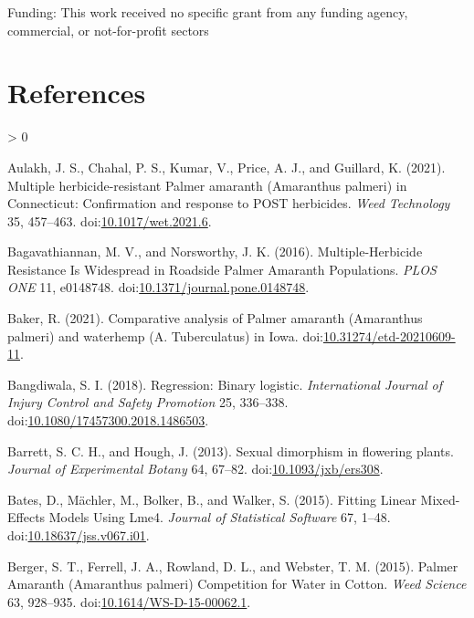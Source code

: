 \documentclass[utf8]{frontiersSCNS}
\newlength{\cslhangindent}
\newenvironment{CSLReferences}[2] %
 {%
  \setlength{\parindent}{0pt}
  \ifodd #1 \everypar{\setlength{\hangindent}{\cslhangindent}}\ignorespaces\fi
  \ifnum #2 > 0
  \setlength{\parskip}{#2\baselineskip}
  \fi
 }%
 {}
\begin{document}
Funding: This work received no specific grant from any funding agency,
commercial, or not-for-profit sectors

\hypertarget{references}{%
\section*{References}\label{references}}

\hypertarget{refs}{}
\begin{CSLReferences}{1}{0}
\leavevmode\hypertarget{ref-aulakh2021}{}%
Aulakh, J. S., Chahal, P. S., Kumar, V., Price, A. J., and Guillard, K.
(2021). Multiple herbicide-resistant {Palmer} amaranth ({Amaranthus}
palmeri) in {Connecticut}: Confirmation and response to {POST}
herbicides. \emph{Weed Technology} 35, 457--463.
doi:\href{https://doi.org/10.1017/wet.2021.6}{10.1017/wet.2021.6}.

\leavevmode\hypertarget{ref-bagavathiannan2016}{}%
Bagavathiannan, M. V., and Norsworthy, J. K. (2016). Multiple-{Herbicide
Resistance Is Widespread} in {Roadside Palmer Amaranth Populations}.
\emph{PLOS ONE} 11, e0148748.
doi:\href{https://doi.org/10.1371/journal.pone.0148748}{10.1371/journal.pone.0148748}.

\leavevmode\hypertarget{ref-baker2021}{}%
Baker, R. (2021). Comparative analysis of {Palmer} amaranth
({Amaranthus} palmeri) and waterhemp ({A}. Tuberculatus) in {Iowa}.
doi:\href{https://doi.org/10.31274/etd-20210609-11}{10.31274/etd-20210609-11}.

\leavevmode\hypertarget{ref-bangdiwala2018}{}%
Bangdiwala, S. I. (2018). Regression: Binary logistic.
\emph{International Journal of Injury Control and Safety Promotion} 25,
336--338.
doi:\href{https://doi.org/10.1080/17457300.2018.1486503}{10.1080/17457300.2018.1486503}.

\leavevmode\hypertarget{ref-barrett2013}{}%
Barrett, S. C. H., and Hough, J. (2013). Sexual dimorphism in flowering
plants. \emph{Journal of Experimental Botany} 64, 67--82.
doi:\href{https://doi.org/10.1093/jxb/ers308}{10.1093/jxb/ers308}.

\leavevmode\hypertarget{ref-bates2015}{}%
Bates, D., Mächler, M., Bolker, B., and Walker, S. (2015). Fitting
{Linear Mixed}-{Effects Models Using} Lme4. \emph{Journal of Statistical
Software} 67, 1--48.
doi:\href{https://doi.org/10.18637/jss.v067.i01}{10.18637/jss.v067.i01}.

\leavevmode\hypertarget{ref-berger2015}{}%
Berger, S. T., Ferrell, J. A., Rowland, D. L., and Webster, T. M.
(2015). Palmer {Amaranth} ({Amaranthus} palmeri) {Competition} for
{Water} in {Cotton}. \emph{Weed Science} 63, 928--935.
doi:\href{https://doi.org/10.1614/WS-D-15-00062.1}{10.1614/WS-D-15-00062.1}.


\end{CSLReferences}
\end{document}
